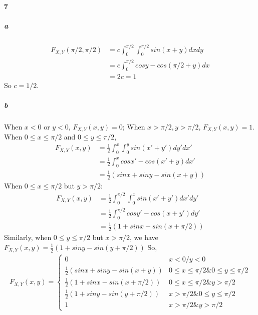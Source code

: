 \documentclass[22pt]{article}
\begin{document}
   \paragraph{7}
   		\subparagraph{a} 
   		\begin{align}
   		F_{X,Y}(\pi/2,\pi/2) & = c\int_{0}^{\pi/2}\int_{0}^{\pi/2}sin(x+y)dxdy\\
   		& = c\int_{0}^{\pi/2}cosy-cos(\pi/2+y)dx\\
   		& = 2c = 1
   		\end{align}
   		So $c = 1/2.$
   		\subparagraph{b}
   		When $x<0 $ or $y<0$, $F_{X,Y}(x,y) = 0$; When $x > \pi/2, y> \pi	/2$, $F_{X,Y}(x,y) = 1$.
   		When $0\leq x \leq \pi/2$ and $0\leq y \leq \pi	/2$,
   		\begin{align}
   		F_{X,Y}(x,y) & = \frac{1}{2}\int_{0}^{x}\int_{0}^{y} sin(x'+y') dy'dx' \\
   		& = \frac{1}{2}\int_{0}^{x} cosx' - cos(x'+y) dx'\\
   		& = \frac{1}{2}(sinx + siny - sin(x+y))
   		\end{align}
   		When $0\leq x \leq \pi/2$ but $y > \pi	/2$:
   		\begin{align}
   		F_{X,Y}(x,y) & = \frac{1}{2}\int_{0}^{\pi	/2}\int_{0}^{x} sin(x'+y') dx'dy' \\
   		& =\frac{1}{2} \int_{0}^{\pi	/2} cosy' - cos(x+y') dy'\\
   		& =\frac{1}{2}( 1 + sinx - sin(x+\pi/2))
   		\end{align}
   		Similarly, when $0\leq y \leq \pi/2$ but $x > \pi	/2$, we have $F_{X,Y}(x,y) =\frac{1}{2}( 1 + siny - sin(y+\pi/2)) $
   		So,\begin{align}
    		F_{X,Y}(x,y) = 
				\begin{cases}
				0 & x<0/y<0\\
				\frac{1}{2}(sinx + siny - sin(x+y) ) & 0\leq x \leq \pi/2 \& 0\leq y \leq \pi/2\\
				\frac{1}{2}(1 + sinx - sin(x+\pi/2) )& 0\leq x \leq \pi/2 \& y > \pi	/2\\
				\frac{1}{2}(1 + siny - sin(y+\pi/2)) & x > \pi	/2 \&  0\leq y \leq \pi/2\\
				1 & x > \pi	/2  \& y > \pi	/2 
				\end{cases}
		\end{align}
\end{document}

